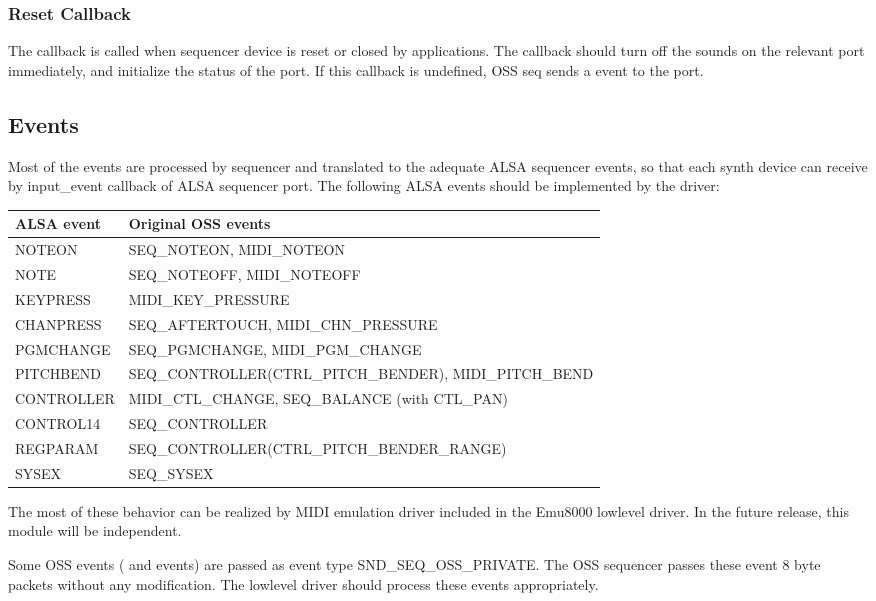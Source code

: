 \documentclass[a4paper,8pt,english]{sphinxmanual}
\begin{document}
\subsubsection{Reset Callback}
\label{sound/designs/seq-oss:reset-callback}
The  callback is called when sequencer device is reset or
closed by applications. The callback should turn off the sounds on the
relevant port immediately, and initialize the status of the port. If this
callback is undefined, OSS seq sends a  event to the
port.


\subsection{Events}
\label{sound/designs/seq-oss:events}
Most of the events are processed by sequencer and translated to the adequate
ALSA sequencer events, so that each synth device can receive by input\_event
callback of ALSA sequencer port. The following ALSA events should be
implemented by the driver:

\begin{tabulary}{\linewidth}{|L|L|}
\hline
\textsf{\relax 
ALSA event
} & \textsf{\relax 
Original OSS events
}\\
\hline
NOTEON
 & 
SEQ\_NOTEON, MIDI\_NOTEON
\\
\hline
NOTE
 & 
SEQ\_NOTEOFF, MIDI\_NOTEOFF
\\
\hline
KEYPRESS
 & 
MIDI\_KEY\_PRESSURE
\\
\hline
CHANPRESS
 & 
SEQ\_AFTERTOUCH, MIDI\_CHN\_PRESSURE
\\
\hline
PGMCHANGE
 & 
SEQ\_PGMCHANGE, MIDI\_PGM\_CHANGE
\\
\hline
PITCHBEND
 & 
SEQ\_CONTROLLER(CTRL\_PITCH\_BENDER),
MIDI\_PITCH\_BEND
\\
\hline
CONTROLLER
 & 
MIDI\_CTL\_CHANGE,
SEQ\_BALANCE (with CTL\_PAN)
\\
\hline
CONTROL14
 & 
SEQ\_CONTROLLER
\\
\hline
REGPARAM
 & 
SEQ\_CONTROLLER(CTRL\_PITCH\_BENDER\_RANGE)
\\
\hline
SYSEX
 & 
SEQ\_SYSEX
\\
\hline\end{tabulary}


The most of these behavior can be realized by MIDI emulation driver
included in the Emu8000 lowlevel driver. In the future release, this module
will be independent.

Some OSS events ( and  events) are passed as event
type SND\_SEQ\_OSS\_PRIVATE.  The OSS sequencer passes these event 8 byte
packets without any modification. The lowlevel driver should process these
events appropriately.
\end{document}
